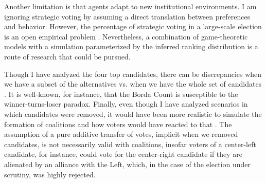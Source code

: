 \documentclass[hidelinks,11pt]{article}
\begin{document}
Another limitation is that agents adapt to new institutional environments. I am
ignoring strategic voting by assuming a direct translation between preferences
and behavior. However, the percentage of strategic voting in a large-scale
election is an open empirical problem
\parencite{straeten10_strat_sincer_heuris_votin_under,kawai2013inferring}.
Nevertheless, a combination of game-theoretic models with a simulation
parameterized by the inferred ranking distribution is a route of research that
could be pursued.

Though I have analyzed the four top candidates, there can be discrepancies when
we have a subset of the alternatives vs. when we have the whole set of
candidates \parencite{saari2001chaotic, kaminski2015empirical}. It is
well-known, for instance, that the Borda Count is susceptible to the
winner-turns-loser paradox. Finally, even though I have analyzed scenarios in
which candidates were removed, it would have been more realistic to simulate the
formation of coalitions and how voters would have reacted to that \parencite
{kaminski1998revival}. The assumption of a pure additive transfer of votes,
implicit when we removed candidates, is not necessarily valid with coalitions,
insofar voters of a center-left candidate, for instance, could vote for the
center-right candidate if they are alienated by an alliance with the Left,
which, in the case of the election under scrutiny, was highly rejected.
\printbibliography
\end{document}
